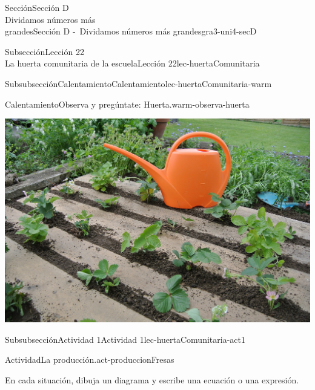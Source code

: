 \begin{sectionptx}{Sección}{{\Large Sección D\\}Dividamos números más\\grandes}{}{Sección D -~Dividamos números más grandes}{}{}{gra3-uni4-secD}
\begin{subsectionptx}{Subsección}{{\normalsize Lección 22\\[-0.05cm]}La huerta comunitaria de la escuela}{}{Lección 22}{}{}{lec-huertaComunitaria}
\begin{subsubsectionptx}{Subsubsección}{Calentamiento}{}{Calentamiento}{}{}{lec-huertaComunitaria-warm}
\begin{exploration}{Calentamiento}{Observa y pregúntate: Huerta.}{warm-observa-huerta}
\begin{image}{0.125}{0.75}{0.125}{}
\includegraphics[max width=\linewidth, center]{external/jpg-source/3-4-D-22-warm-garden-934189_1920.jpg}
\end{image}%
\end{exploration}%
%
\end{subsubsectionptx}
%
%
\typeout{************************************************}
\typeout{************************************************}
%
\begin{subsubsectionptx}{Subsubsección}{Actividad 1}{}{Actividad 1}{}{}{lec-huertaComunitaria-act1}
\begin{activity}{Actividad}{La producción.}{act-produccionFresas}%
\begin{sidebyside}{2}{0.025}{0.025}{0.05}%
\begin{sbspanel}{0.6}%
En cada situación, dibuja un diagrama y escribe una ecuación o una expresión.%
\end{sbspanel}%
\begin{sbspanel}{0.3}%

\end{sbspanel}
\end{sidebyside}
\end{activity}
\end{subsubsectionptx}
\end{subsectionptx}
\end{sectionptx}
